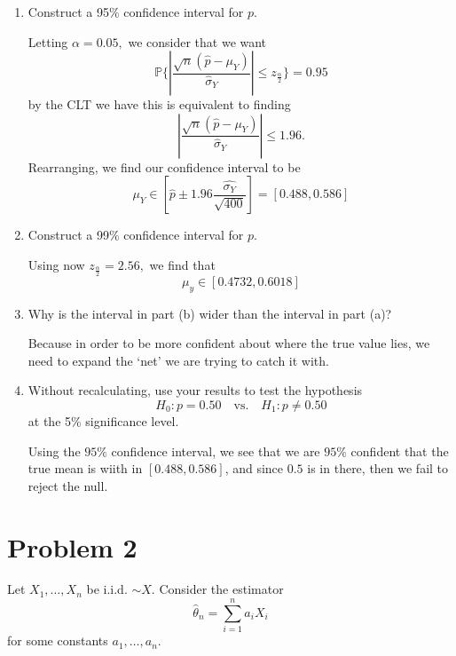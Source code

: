 \documentclass[11pt]{article}
\newcommand{\bbP}{\mathbb{P}}
\begin{document}
\begin{enumerate}[label=(\alph*)]
    \item Construct a 95\% confidence interval for \( p \).
\begin{solution}
Letting $\alpha = 0.05,$ we consider that we want 
\[\bbP\{\left|\frac{\sqrt{n}(\hat{p} - \mu_Y)}{\hat{\sigma}_Y}\right| \leq z_{\frac{\alpha}{2}}\} = 0.95\] by the CLT we have this is equivalent to finding
\[\left|\frac{\sqrt{n}(\hat{p} - \mu_Y)}{\hat{\sigma}_Y}\right| \leq 1.96.\] Rearranging, we find our confidence interval to be 
\[\mu_Y \in [\hat{p}\pm 1.96\frac{\hat{\sigma_Y}}{\sqrt{400}}] = [0.488, 0.586]\]
\end{solution}

    \item Construct a 99\% confidence interval for \( p \).
\begin{solution}
    Using now $z_{\frac{\alpha}{2}} = 2.56,$ we find that 
    \[\mu_y \in [0.4732, 0.6018]\]
\end{solution}
    \item Why is the interval in part (b) wider than the interval in part (a)?
\begin{solution}
    Because in order to be more confident about where the true value lies, we need to expand the `net' we are trying to catch it with.
\end{solution}
    \item Without recalculating, use your results to test the hypothesis
    \[
    H_0: p = 0.50 \quad \text{vs.} \quad H_1: p \ne 0.50
    \]
    at the 5\% significance level.
    \begin{solution}
        Using the $95\%$ confidence interval, we see that we are $95\%$ confident that the true mean is wiith in $[0.488, 0.586]$, and since $0.5$ is in there, then we fail to reject the null.
    \end{solution}
\end{enumerate}

\newpage
\section*{Problem 2}
Let \( X_1, \ldots, X_n \) be i.i.d. \( \sim X \). Consider the estimator
\[
\hat{\theta}_n = \sum_{i=1}^n a_i X_i
\]
for some constants \( a_1, \ldots, a_n \).
\end{document}
